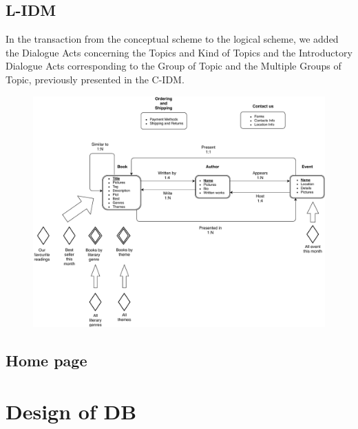 \documentclass[12pt,a4paper]{article}
\begin{document}
\subsection{L-IDM}
In the transaction from the conceptual scheme to the logical scheme, we added the Dialogue Acts concerning the Topics and Kind of Topics and the Introductory Dialogue Acts corresponding to the Group of Topic and the Multiple Groups of Topic, previously presented in the C-IDM.
\begin{figure}[h!]
	\centering
	\includegraphics[width=1.0\linewidth]{L-IDM}
	\label{fig:l-idm}	
\end{figure}

\subsection{Home page}




\newpage
\section{Design of DB} 	
\end{document}
